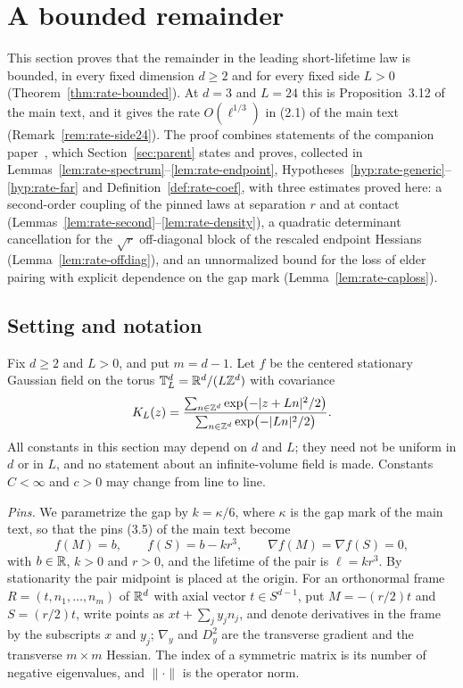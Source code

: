 \section{A bounded remainder}\label{sec:rate}

This section proves that the remainder in the leading short-lifetime law is bounded, in every fixed dimension $d\ge2$ and for every fixed side $L>0$ (Theorem~\ref{thm:rate-bounded}). At $d=3$ and $L=24$ this is Proposition~3.12 of the main text, and it gives the rate $O(\ell^{1/3})$ in (2.1) of the main text (Remark~\ref{rem:rate-side24}). The proof combines statements of the companion paper~\cite{parentP}, which Section~\ref{sec:parent} states and proves, collected in Lemmas~\ref{lem:rate-spectrum}--\ref{lem:rate-endpoint}, Hypotheses~\ref{hyp:rate-generic}--\ref{hyp:rate-far} and Definition~\ref{def:rate-coef}, with three estimates proved here: a second-order coupling of the pinned laws at separation $r$ and at contact (Lemmas~\ref{lem:rate-second}--\ref{lem:rate-density}), a quadratic determinant cancellation for the $\sqrt r$ off-diagonal block of the rescaled endpoint Hessians (Lemma~\ref{lem:rate-offdiag}), and an unnormalized bound for the loss of elder pairing with explicit dependence on the gap mark (Lemma~\ref{lem:rate-caploss}).

\subsection*{Setting and notation}

Fix $d\ge2$ and $L>0$, and put $m=d-1$. Let $f$ be the centered stationary Gaussian field on the torus $\mathbb T^d_L=\mathbb R^d/(L\mathbb Z^d)$ with covariance
\begin{equation}\label{eq:rate-KL}
K_L(z)=\frac{\sum_{n\in\mathbb Z^d}\exp\bigl(-|z+Ln|^2/2\bigr)}{\sum_{n\in\mathbb Z^d}\exp\bigl(-|Ln|^2/2\bigr)} .
\end{equation}
All constants in this section may depend on $d$ and $L$; they need not be uniform in $d$ or in $L$, and no statement about an infinite-volume field is made. Constants $C<\infty$ and $c>0$ may change from line to line.

\emph{Pins.} We parametrize the gap by $k=\kappa/6$, where $\kappa$ is the gap mark of the main text, so that the pins (3.5) of the main text become
\begin{equation}\label{eq:rate-pins}
f(M)=b,\qquad f(S)=b-kr^3,\qquad \nabla f(M)=\nabla f(S)=0,
\end{equation}
with $b\in\mathbb R$, $k>0$ and $r>0$, and the lifetime of the pair is $\ell=kr^3$. By stationarity the pair midpoint is placed at the origin. For an orthonormal frame $R=(t,n_1,\dots,n_m)$ of $\mathbb R^d$ with axial vector $t\in S^{d-1}$, put $M=-(r/2)t$ and $S=(r/2)t$, write points as $xt+\sum_jy_jn_j$, and denote derivatives in the frame by the subscripts $x$ and $y_j$; $\nabla_y$ and $D_y^2$ are the transverse gradient and the transverse $m\times m$ Hessian. The index of a symmetric matrix is its number of negative eigenvalues, and $\|\cdot\|$ is the operator norm.

